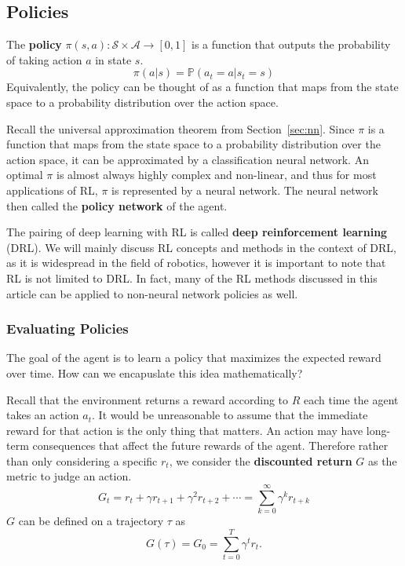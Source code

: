 \documentclass[12pt]{report}
\theoremstyle{definition}
\theoremstyle{remark}
\begin{document}
\subsection{Policies}

The \textbf{policy} $\pi(s, a): \mathcal{S} \times \mathcal{A} \to [0,1]$ is a function that outputs the probability of taking action $a$ in state $s$.
\begin{equation}
    \pi(a | s) = \mathbb{P}(a_t = a | s_t = s)
\end{equation}
Equivalently, the policy can be thought of as a function that maps from the state space to a probability distribution over the action space.

Recall the universal approximation theorem from Section~\ref{sec:nn}. Since $\pi$ is a function that maps from the state space to a probability distribution over the action space, it can be approximated by a classification neural network. An optimal $\pi$ is almost always highly complex and non-linear, and thus for most applications of RL, $\pi$ is represented by a neural network. The neural network then called the \textbf{policy network} of the agent.

The pairing of deep learning with RL is called \textbf{deep reinforcement learning} (DRL). We will mainly discuss RL concepts and methods in the context of DRL, as it is widespread in the field of robotics, however it is important to note that RL is not limited to DRL\@. In fact, many of the RL methods discussed in this article can be applied to non-neural network policies as well.

\subsubsection{Evaluating Policies}
The goal of the agent is to learn a policy that maximizes the expected reward over time. How can we encapuslate this idea mathematically?

Recall that the environment returns a reward according to $R$ each time the agent takes an action $a_t$. It would be unreasonable to assume that the immediate reward for that action is the only thing that matters. An action may have long-term consequences that affect the future rewards of the agent. Therefore rather than only considering a specific $r_t$, we consider the \textbf{discounted return} $G$ as the metric to judge an action.
\begin{equation}
    G_t = r_t + \gamma r_{t+1} + \gamma^2 r_{t+2} + \cdots = \sum_{k=0}^{\infty} \gamma^k r_{t+k}
\end{equation}
$G$ can be defined on a trajectory $\tau$ as
\begin{equation}
    G(\tau) = G_0 = \sum_{t=0}^{T} \gamma^t r_t.
\end{equation}
\end{document}
